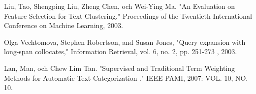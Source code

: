 \documentclass[conference]{IEEEtran}
\begin{document}
\begin{thebibliography}{1}
Liu, Tao, Shengping Liu, Zheng Chen, och Wei-Ying Ma. "An Evaluation on Feature
Selection for Text Clustering." Proceedings of the Twentieth International
Conference on Machine Learning, 2003.

Olga Vechtomova, Stephen Robertson, and Susan Jones, "Query expansion with long-span collocates," Information Retrieval, vol. 6, no. 2, pp. 251-273 , 2003.

Lan, Man, och Chew Lim Tan. "Supervised and Traditional Term Weighting Methods for
Automatic Text Categorization ." IEEE PAMI, 2007: VOL. 10, NO. 10.

\end{thebibliography}





\end{document}
